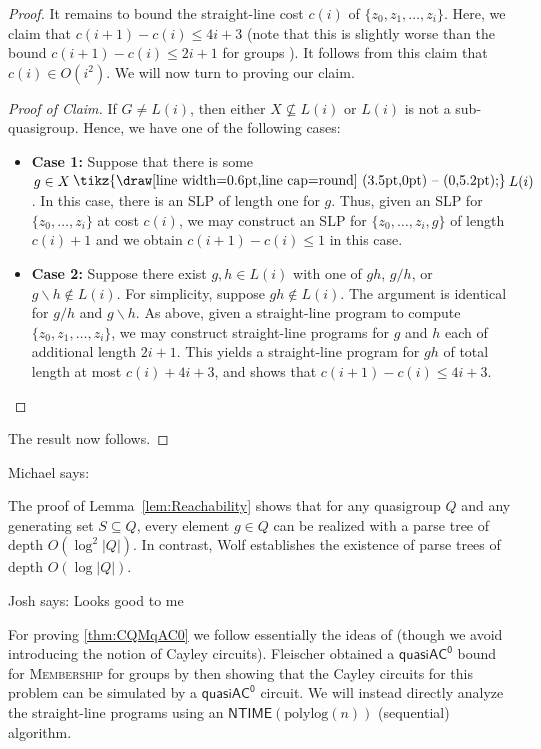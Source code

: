 \documentclass{article}
\newcommand{\jsay}[1]{{\color{red} Josh says: #1}}
\newcommand{\msay}[1]{{\color{blue} Michael says: #1}}
\newcommand{\algprobm}[1]{\textsc{#1}\xspace}
\renewcommand{\setminus}{\mysetminus}
\newcommand{\mysetminusD}{\raisebox{.8pt}{\hbox{\tikz{\draw[line width=0.6pt,line cap=round] (3.5pt,0pt) -- (0,5.2pt);}}}}
\newcommand{\mysetminusT}{\mysetminusD}
\newcommand{\mysetminusS}{\raisebox{.5pt}{\hbox{\tikz{\draw[line width=0.45pt,line cap=round] (2.2pt,0) -- (0,3.8pt);}}}}
\newcommand{\mysetminusSS}{\raisebox{.35pt}{\hbox{\tikz{\draw[line width=0.4pt,line cap=round] (1.5pt,0) -- (0,2.8pt);}}}}
\newcommand{\mysetminus}{\mathbin{\mathchoice{\mysetminusD}{\mysetminusT}{\mysetminusS}{\mysetminusSS}}}
\newcommand*{\ComplexityClass}[1]{\ensuremath{\mathsf{#1}}\xspace}
\newcommand{\qACz}{\ComplexityClass{quasiAC^0}}
\newcommand{\NTIME}{\ComplexityClass{NTIME}}
\begin{document}
\begin{proof}
It remains to bound the straight-line cost $c(i)$ of $\{z_0, z_{1}, \ldots, z_{i}\}$. Here, we claim that $c(i+1) - c(i) \leq 4i+3$ (note that this is slightly worse than the bound $c(i+1) - c(i) \leq 2i+1$ for groups \cite{BabaiSzemeredi}). It follows from this claim that $c(i) \in O(i^2)$. We will now turn to proving our claim.

\begin{proof}[Proof of Claim]
If $G \neq L(i)$, then either $X \not\subseteq L(i)$ or $L(i)$ is not a sub-quasigroup. Hence, we have one of the following cases:
\begin{itemize}
    \item \textbf{Case 1:} Suppose that there is some $g \in X \setminus L(i)$. In this case, there is an SLP of length one for $g$.
    Thus, given an SLP for $\{ z_0, \ldots, z_i\}$ at cost $c(i)$, we may construct an SLP for $\{ z_0, \ldots, z_i,g\}$ of length $c(i) + 1$ and we obtain $c(i+1) - c(i) \leq 1$ in this case.


    \item \textbf{Case 2:} Suppose there exist $g,h \in L(i)$ with one of $gh$, $g/h$, or $g\backslash h \not \in L(i)$. For simplicity, suppose $gh \not \in L(i).$ The argument is identical for $g/h$ and  $g\backslash h$. As above, given a straight-line program to compute $\{z_0, z_1, \ldots, z_i\}$, we may construct straight-line programs for $g$ and $h$ each of additional length $2i+1$. This yields a straight-line program for $gh$ of total length at most $c(i) + 4i+3$, and shows that $c(i+1) - c(i) \leq 4i+3$.\qedhere 
\end{itemize} 
\end{proof}
\noindent The result now follows.
\end{proof}

\msay{
\begin{remark}
The proof of Lemma~\ref{lem:Reachability} shows that for any quasigroup $Q$ and any generating set $S \subseteq Q$, every element $g \in Q$ can be realized with a parse tree of depth $O(\log^2 |Q|)$. In contrast, Wolf \cite{Wolf} establishes the existence of parse trees of depth $O(\log |Q|)$.   
\end{remark}
}
\jsay{Looks good to me}

For proving \cref{thm:CQMqAC0} we follow essentially the ideas of \cite{Fleischer} (though we avoid introducing the notion of Cayley circuits). Fleischer obtained a $\qACz$ bound for \algprobm{Membership} for groups by then showing that the Cayley circuits for this problem can be simulated by a $\qACz$ circuit. We will instead directly analyze the straight-line programs using an $\NTIME(\text{polylog}(n))$ (sequential) algorithm.
\end{document}
